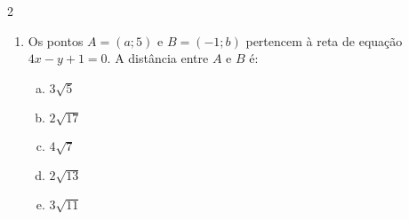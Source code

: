\documentclass[a4paper,14pt]{article}
\begin{document}
\begin{multicols}{2}
\begin{enumerate}
\begin{enumerate}[a)]
            	\item ao eixo das abscissas.\\\\\\\\\\\\\\\\\\\\\\\\\\\\\\\\\\\\\\\\\\\\\\\\\\\\\\\\
            \end{enumerate}
            \item Os pontos $A = (a; 5)$ e $B = (-1; b)$ pertencem à reta de equação $4x - y + 1 = 0$. A distância entre $A$ e $B$ é:
            \begin{enumerate}[a)]
            	\item $3\sqrt{5}$
            	\item $2\sqrt{17}$
            	\item $4\sqrt{7}$
            	\item $2\sqrt{13}$
            	\item $3\sqrt{11}$
            \end{enumerate}
        \end{enumerate}

\end{multicols}
\end{document}
